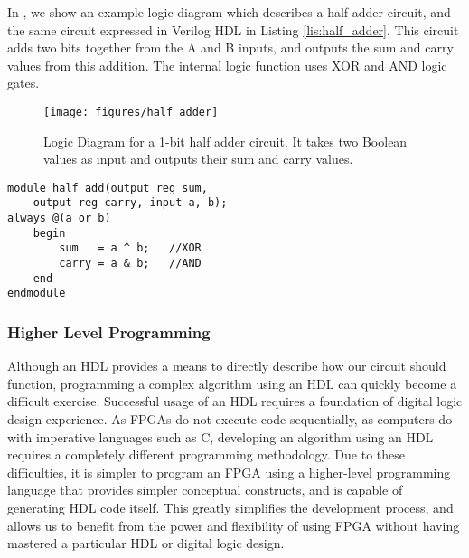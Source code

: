 In , we show an example logic diagram which
describes a half-adder circuit, and the same circuit expressed in Verilog HDL
in Listing \ref{lis:half_adder}.  This circuit adds two bits together from the
A and B inputs, and outputs the sum and carry values from this addition.  The
internal logic function uses XOR and AND logic gates.

\begin{figure}[!ht] 
 \centering 
 \texttt{[image: figures/half\_adder]} 
 \caption[Half Adder Logic]{Logic Diagram for a 1-bit half adder circuit.  It takes two Boolean values as input and outputs their sum and carry values.} 
 \label{fig:half_adder} 
\end{figure}

\lstset{
  language=Verilog,
  numbers=none,
  basicstyle=\small,
  stringstyle=\ttfamily,
  showstringspaces=false,
  captionpos=b
}


\begin{lstlisting}[float=!h,caption=Verilog program for a one bit half-adder, label=lis:half_adder,xleftmargin=80pt]
module half_add(output reg sum, 
    output reg carry, input a, b);
always @(a or b)          
    begin 
        sum   = a ^ b;   //XOR
        carry = a & b;   //AND
    end
endmodule
\end{lstlisting}



\subsubsection{Higher Level Programming}

\label{higher_level_programming} 

Although an HDL provides a means to directly describe how our circuit should
function, programming a complex algorithm using an HDL can quickly become a
difficult exercise.  Successful usage of an HDL requires a foundation of
digital logic design experience.  As FPGAs do not execute code sequentially,
as computers do with imperative languages such as C, developing an algorithm
using an HDL requires a completely different programming methodology.
Due to these difficulties, it is simpler to program an FPGA using a
higher-level programming language that provides simpler conceptual constructs,
and is capable of generating HDL code itself.  This greatly simplifies the
development process, and allows us to benefit from the power and flexibility
of using FPGA without having mastered a particular HDL or digital logic design.


